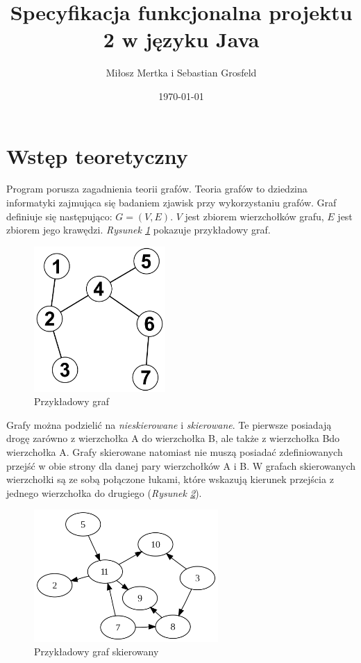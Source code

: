 \documentclass{article}
\title{Specyfikacja funkcjonalna projektu 2 w języku Java}
\author{Miłosz Mertka i Sebastian Grosfeld}
\date{\today}
\begin{document}
\maketitle

\tableofcontents

\newpage

\setlength{\headheight}{23pt}

\section{Wstęp teoretyczny}

Program porusza zagadnienia teorii grafów. Teoria grafów to dziedzina informatyki zajmująca się badaniem zjawisk przy wykorzystaniu grafów. Graf definiuje się następująco: $G=(V,E)$. $V$ jest zbiorem wierzchołków grafu, $E$ jest zbiorem jego krawędzi. \emph{Rysunek \ref{fig:graph}} pokazuje przykładowy graf.

\begin{figure}[htp]
    \centering
    \includegraphics[width=5cm]{images/graph.png}
    \caption{Przykładowy graf}
    \label{fig:graph}
\end{figure}

Grafy można podzielić na \emph{nieskierowane} i \emph{skierowane}. Te pierwsze posiadają drogę zarówno z wierzchołka A do wierzchołka B, ale także z wierzchołka B\linebreak do wierzchołka A. Grafy skierowane natomiast nie muszą posiadać zdefiniowanych przejść w obie strony dla danej pary wierzchołków A i B. W grafach skierowanych wierzchołki są ze sobą połączone łukami, które wskazują kierunek przejścia z jednego wierzchołka do drugiego (\emph{Rysunek \ref{fig:directed_graph}}).

\begin{figure}[htp]
    \centering
    \includegraphics[width=7cm]{images/directed_graph.png}
    \caption{Przykładowy graf skierowany}
    \label{fig:directed_graph}
\end{figure}
\end{document}

